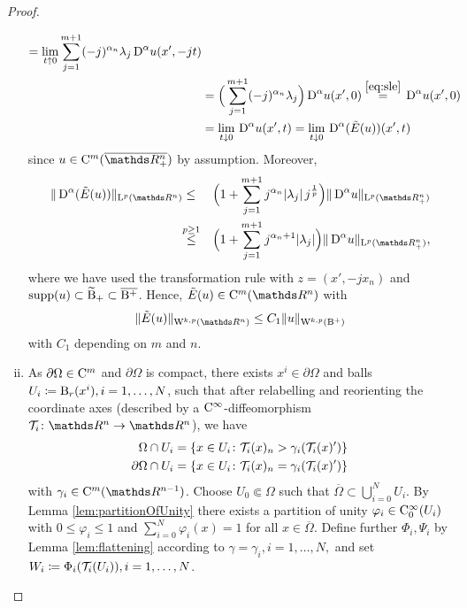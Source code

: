 \begin{proof}
\begin{enumerate}[i)]
\begin{align*}
        = \lim_{t \uparrow 0} \sum_{j = 1}^{m + 1} (-j)^{\alpha_n} \lambda_j \,{\operatorname{D}}^\alpha u(x', -jt) \\
        &= \Big(\sum_{j = 1}^{m + 1} (-j)^{\alpha_n} \lambda_j \Big) \,{\operatorname{D}}^\alpha u (x',0)
        \overset{\eqref{eq:sle}}{=} \,{\operatorname{D}}^\alpha u(x', 0) \\
        &= \lim_{t \downarrow 0} \,{\operatorname{D}}^\alpha u(x', t) 
        = \lim_{t \downarrow 0} \,{\operatorname{D}}^\alpha(\tilde E(u))(x', t)
      \end{align*}
      since $u \in \CC^m(\overline{\R^n_+})$ by assumption.
      Moreover,
      \begin{alignat*}{2}
        \|\DD^\alpha(\tilde E(u)) \|_{\Ell^p(\R^n)}
        &\leq &&\Big( 1 + \sum_{j = 1}^{m + 1} j^{\alpha_n} |\lambda_j|\, j^{\frac{1}{p}} \Big) \|\DD^\alpha u\|_{\Ell^p(\R^n_+)}  \\
        &\hspace{-0.3em}\overset{p \geq 1}{\leq} &&\Big( 1 + \sum_{j = 1}^{m + 1} j^{\alpha_n + 1} |\lambda_j| \Big) \|\DD^\alpha u\|_{\Ell^p(\R^n_+)},
      \end{alignat*}
      where we have used the transformation rule with $z = (x', -jx_n)$ and $\operatorname{supp}(u) \subset \widetilde {\mathrm{B}}_+ \subset \overline{\mathrm{B}^+}$.
      Hence, $\tilde E(u) \in\CC^m(\R^n)$ with
      \begin{equation}
        \label{eq:contExt}
        \|\tilde E (u)\|_{\WW^{k,p}(\R^n)} \leq C_1 \|u\|_{\WW^{k,p}(\BB^+)}
      \end{equation}
      with $C_1$ depending on $m$ and $n$.

    \item As $\partial \Omega \in \mathrm{C}^m$ and $\partial \Omega$ is compact, there exists $x^i \in \partial\Omega$ and balls $U_i \coloneqq \mathrm{B}_r(x^i), i = 1,\dots,N$, such that after relabelling and reorienting the coordinate axes (described by a $\mathrm{C}^\infty$\hyp{}diffeomorphism $\Tau_i \colon \R^n \to \R^n$), we have
      \begin{align*}
        \Omega \cap U_i &= \{ x \in U_i \colon \mathcal{T}_i(x)_n > \gamma_i(\mathcal{T}_i(x)') \} \\
        \partial\Omega \cap U_i &= \{x \in U_i \colon \mathcal{T}_i(x)_n = \gamma_i(\mathcal{T}_i(x)')\}
      \end{align*}
      with $\gamma_i \in \CC^m(\R^{n - 1})$.
      Choose $U_0 \Subset \Omega$ such that $\overline\Omega \subset \bigcup_{i = 0}^N U_i$.
      By Lemma \ref{lem:partitionOfUnity} there exists a partition of unity $\varphi_i \in \mathrm{C}_0^\infty(U_i)$ with $0 \leq \varphi_i \leq 1$ and $\sum_{i = 0}^N \varphi_i(x) = 1$ for all $x \in \overline\Omega$.
      Define further $\Phi_i,\Psi_i$ by Lemma \ref{lem:flattening} according to $\gamma = \gamma_i, i = 1,\dots,N,$ and set $W_i \coloneqq \Phi_i(\mathcal{T}_i(U_i)), i = 1,\dots,N$.


\end{enumerate}
\end{proof}
